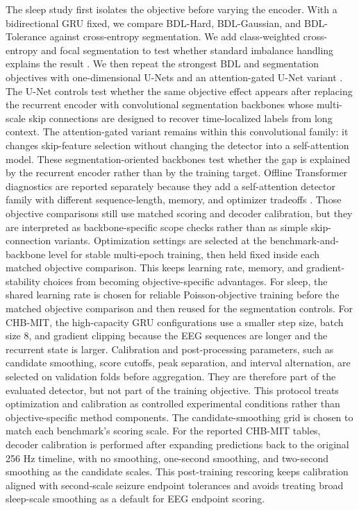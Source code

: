 The sleep study first isolates the objective before varying the encoder.
With a bidirectional GRU fixed, we compare BDL-Hard, BDL-Gaussian, and BDL-Tolerance against cross-entropy segmentation.
We add class-weighted cross-entropy and focal segmentation to test whether standard imbalance handling explains the result \citep{krawczyk2016,lin2017focal}.
We then repeat the strongest BDL and segmentation objectives with one-dimensional U-Nets and an attention-gated U-Net variant \citep{ronneberger2015,oktay2018attention}.
The U-Net controls test whether the same objective effect appears after replacing the recurrent encoder with convolutional segmentation backbones whose multi-scale skip connections are designed to recover time-localized labels from long context.
The attention-gated variant remains within this convolutional family: it changes skip-feature selection without changing the detector into a self-attention model.
These segmentation-oriented backbones test whether the gap is explained by the recurrent encoder rather than by the training target.
Offline Transformer diagnostics are reported separately because they add a self-attention detector family with different sequence-length, memory, and optimizer tradeoffs \citep{vaswani2017attention}.
Those objective comparisons still use matched scoring and decoder calibration, but they are interpreted as backbone-specific scope checks rather than as simple skip-connection variants.
Optimization settings are selected at the benchmark-and-backbone level for stable multi-epoch training, then held fixed inside each matched objective comparison.
This keeps learning rate, memory, and gradient-stability choices from becoming objective-specific advantages.
For sleep, the shared learning rate is chosen for reliable Poisson-objective training before the matched objective comparison and then reused for the segmentation controls.
For CHB-MIT, the high-capacity GRU configurations use a smaller step size, batch size 8, and gradient clipping because the EEG sequences are longer and the recurrent state is larger.
Calibration and post-processing parameters, such as candidate smoothing, score cutoffs, peak separation, and interval alternation, are selected on validation folds before aggregation.
They are therefore part of the evaluated detector, but not part of the training objective.
This protocol treats optimization and calibration as controlled experimental conditions rather than objective-specific method components.
The candidate-smoothing grid is chosen to match each benchmark's scoring scale.
For the reported CHB-MIT tables, decoder calibration is performed after expanding predictions back to the original 256 Hz timeline, with no smoothing, one-second smoothing, and two-second smoothing as the candidate scales.
This post-training rescoring keeps calibration aligned with second-scale seizure endpoint tolerances and avoids treating broad sleep-scale smoothing as a default for EEG endpoint scoring.

